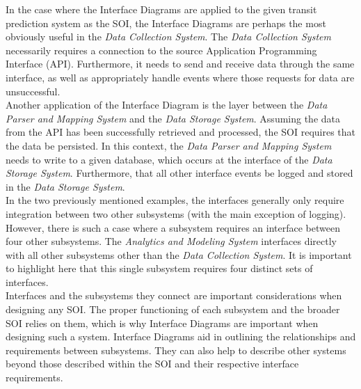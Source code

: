 \documentclass{article}
\begin{document}
In the case where the Interface Diagrams are applied to the given transit prediction system as the SOI, the Interface Diagrams are perhaps the most obviously useful in the \textit{Data Collection System}. The \textit{Data Collection System} necessarily requires a connection to the source Application Programming Interface (API). Furthermore, it needs to send and receive data through the same interface, as well as appropriately handle events where those requests for data are unsuccessful.\\

Another application of the Interface Diagram is the layer between the \textit{Data Parser and Mapping System} and the \textit{Data Storage System}. Assuming the data from the API has been successfully retrieved and processed, the SOI requires that the data be persisted. In this context, the \textit{Data Parser and Mapping System} needs to write to a given database, which occurs at the interface of the \textit{Data Storage System}. Furthermore, that all other interface events be logged and stored in the \textit{Data Storage System}.\\

In the two previously mentioned examples, the interfaces generally only require integration between two other subsystems (with the main exception of logging). However, there is such a case where a subsystem requires an interface between four other subsystems. The \textit{Analytics and Modeling System} interfaces directly with all other subsystems other than the \textit{Data Collection System}. It is important to highlight here that this single subsystem requires four distinct sets of interfaces. \\

Interfaces and the subsystems they connect are important considerations when designing any SOI. The proper functioning of each subsystem and the broader SOI relies on them, which is why Interface Diagrams are important when designing such a system. Interface Diagrams aid in outlining the relationships and requirements between subsystems. They can also help to describe other systems beyond those described within the SOI and their respective interface requirements. 
\end{document}

